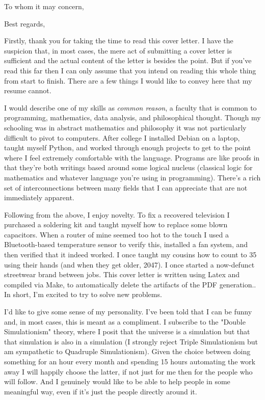 \documentclass[12pt,a4paper,sans]{moderncv}        %
\begin{document}
\date{7 sept 2022}
\opening{To whom it may concern,}
\closing{Best regards,}
\makelettertitle

Firstly, thank you for taking the time to read this cover letter. I have the suspicion that, in most cases, the mere act of submitting a cover letter is sufficient and the actual content of the letter is besides the point. But if you've read this far then I can only assume that you intend on reading this whole thing from start to finish. There are a few things I would like to convey here that my resume cannot.

I would describe one of my skills as \textit{common reason}, a faculty that is common to programming, mathematics, data analysis, and philosophical thought. Though my schooling was in abstract mathematics and philosophy it was not particularly difficult to pivot to computers. After college I installed Debian on a laptop, taught myself Python, and worked through enough projects to get to the point where I feel extremely comfortable with the language. Programs are like proofs in that they're both writings based around some logical nucleus (classical logic for mathematics and whatever language you're using in programming). There's a rich set of interconnections between many fields that I can appreciate that are not immediately apparent.

Following from the above, I enjoy novelty. To fix a recovered television I purchased a soldering kit and taught myself how to replace some blown capacitors. When a router of mine seemed too hot to the touch I used a Bluetooth-based temperature sensor to verify this, installed a fan system, and then verified that it indeed worked. I once taught my cousins how to count to 35 using their hands (and when they get older, 2047). I once started a now-defunct streetwear brand between jobs. This cover letter is written using Latex and compiled via Make, to automatically delete the artifacts of the PDF generation.. In short, I'm excited to try to solve new problems.

I'd like to give some sense of my personality. I've been told that I can be funny and, in most cases, this is meant as a compliment. I subscribe to the "Double Simulationism" theory, where I posit that the universe is a simulation but that that simulation is also in a simulation (I strongly reject Triple Simulationism but am sympathetic to Quadruple Simulationism). Given the choice between doing something for an hour every month and spending 15 hours automating the work away I will happily choose the latter, if not just for me then for the people who will follow. And I genuinely would like to be able to help people in some meaningful way, even if it's just the people directly around it.
\end{document}
